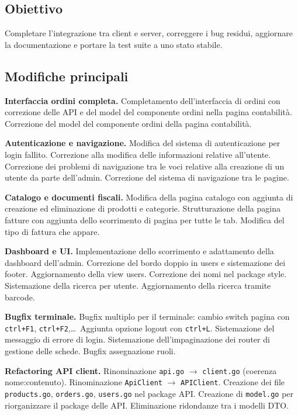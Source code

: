 \documentclass[a4paper,12pt]{article}
\begin{document}
\subsection*{Obiettivo}
Completare l'integrazione tra client e server, correggere i bug residui, aggiornare la documentazione e portare la test suite a uno stato stabile.

\subsection*{Modifiche principali}

\textbf{Interfaccia ordini completa.}
Completamento dell'interfaccia di ordini con correzione delle API e del model del componente ordini nella pagina contabilit\`{a}. Correzione del model del componente ordini della pagina contabilit\`{a}.

\textbf{Autenticazione e navigazione.}
Modifica del sistema di autenticazione per login fallito. Correzione alla modifica delle informazioni relative all'utente. Correzione dei problemi di navigazione tra le voci relative alla creazione di un utente da parte dell'admin. Correzione del sistema di navigazione tra le pagine.

\textbf{Catalogo e documenti fiscali.}
Modifica della pagina catalogo con aggiunta di creazione ed eliminazione di prodotti e categorie. Strutturazione della pagina fatture con aggiunta dello scorrimento di pagina per tutte le tab. Modifica del tipo di fattura che appare.

\textbf{Dashboard e UI.}
Implementazione dello scorrimento e adattamento della dashboard dell'admin. Correzione del bordo doppio in users e sistemazione dei footer. Aggiornamento della view users. Correzione dei nomi nel package style. Sistemazione della ricerca per utente. Aggiornamento della ricerca tramite barcode.

\textbf{Bugfix terminale.}
Bugfix multiplo per il terminale: cambio switch pagina con \texttt{ctrl+F1}, \texttt{ctrl+F2},\ldots\ Aggiunta opzione logout con \texttt{ctrl+L}. Sistemazione del messaggio di errore di login. Sistemazione dell'impaginazione dei router di gestione delle schede. Bugfix assegnazione ruoli.

\textbf{Refactoring API client.}
Rinominazione \texttt{api.go} $\to$ \texttt{client.go} (coerenza nome:contenuto). Rinominazione \texttt{ApiClient} $\to$ \texttt{APIClient}. Creazione dei file \texttt{products.go}, \texttt{orders.go}, \texttt{users.go} nel package API. Creazione di \texttt{model.go} per riorganizzare il package delle API. Eliminazione ridondanze tra i modelli DTO.
\end{document}
